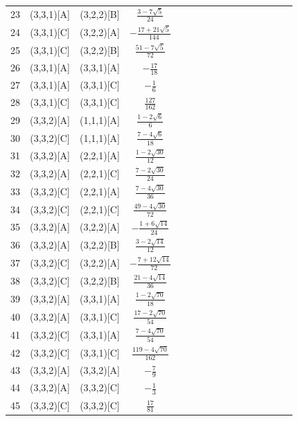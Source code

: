 \documentclass[11pt]{article}
\begin{document}
\begin{longtable}{ | p{1cm}| *{15}{c|} }
23 & (3,3,1)[A] & (3,2,2)[B] & $\frac{3-7\sqrt{5}}{24}$\\ %
24 & (3,3,1)[C] & (3,2,2)[A] & $-\frac{17+21\sqrt{5}}{144}$\\ %
25 & (3,3,1)[C] & (3,2,2)[B] & $\frac{51-7\sqrt{5}}{72}$\\ %
26 & (3,3,1)[A] & (3,3,1)[A] & $-\frac{17}{18}$\\ %
27 & (3,3,1)[A] & (3,3,1)[C] & $-\frac{1}{6}$\\ %
28 & (3,3,1)[C] & (3,3,1)[C] & $\frac{127}{162}$\\ %
29 & (3,3,2)[A] & (1,1,1)[A] & $\frac{1-2\sqrt{6}}{6}$\\ %
30 & (3,3,2)[C] & (1,1,1)[A] & $\frac{7-4\sqrt{6}}{18}$\\ %
31 & (3,3,2)[A] & (2,2,1)[A] & $\frac{1-2\sqrt{30}}{12}$\\ %
32 & (3,3,2)[A] & (2,2,1)[C] & $\frac{7-2\sqrt{30}}{24}$\\ %
33 & (3,3,2)[C] & (2,2,1)[A] & $\frac{7-4\sqrt{30}}{36}$\\ %
34 & (3,3,2)[C] & (2,2,1)[C] & $\frac{49-4\sqrt{30}}{72}$\\ %
35 & (3,3,2)[A] & (3,2,2)[A] & $-\frac{1+6\sqrt{14}}{24}$\\ %
36 & (3,3,2)[A] & (3,2,2)[B] & $\frac{3-2\sqrt{14}}{12}$\\ %
37 & (3,3,2)[C] & (3,2,2)[A] & $-\frac{7+12\sqrt{14}}{72}$\\ %
38 & (3,3,2)[C] & (3,2,2)[B] & $\frac{21-4\sqrt{14}}{36}$\\ %
39 & (3,3,2)[A] & (3,3,1)[A] & $\frac{1-2\sqrt{70}}{18}$\\ %
40 & (3,3,2)[A] & (3,3,1)[C] & $\frac{17-2\sqrt{70}}{54}$\\ %
41 & (3,3,2)[C] & (3,3,1)[A] & $\frac{7-4\sqrt{70}}{54}$\\ %
42 & (3,3,2)[C] & (3,3,1)[C] & $\frac{119-4\sqrt{70}}{162}$\\ %
43 & (3,3,2)[A] & (3,3,2)[A] & $-\frac{7}{9}$\\ %
44 & (3,3,2)[A] & (3,3,2)[C] & $-\frac{1}{3}$\\ %
45 & (3,3,2)[C] & (3,3,2)[C] & $\frac{17}{81}$\\ %
\end{longtable}
\end{document}

